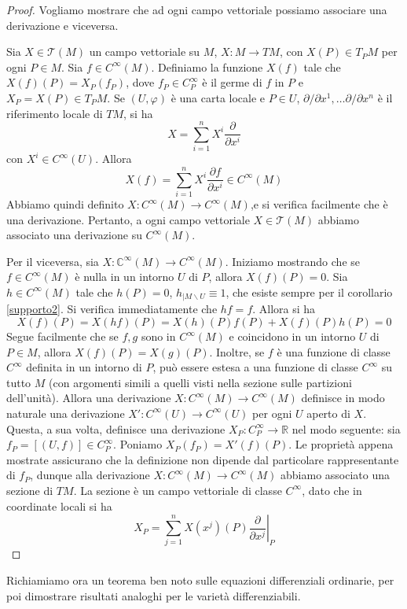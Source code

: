 \documentclass[a4paper,11pt]{article}
\theoremstyle{definition}
\theoremstyle{theorem}
\begin{document}
\begin{proof}
	Vogliamo mostrare che ad ogni campo vettoriale possiamo associare una derivazione e viceversa.
	
	Sia $X\in\mathcal{T}(M)$ un campo vettoriale su $M$, $X\colon M\to TM$, con $X(P)\in T_PM$ per ogni $P\in M$. Sia $f\in C^\infty(M)$. Definiamo la funzione $X(f)$ tale che $X(f)(P)=X_P(f_P)$, dove $f_P\in C^\infty_P$ è il germe di $f$ in $P$ e $X_P=X(P)\in T_PM$. Se $(U,\varphi)$ è una carta locale e $P\in U$, $\partial/\partial x^1,\dots\partial/\partial x^n$ è il riferimento locale di $TM$, si ha
	\[X=\sum_{i=1}^{n}X^i\frac{\partial}{\partial x^i}\]
	con $X^i\in C^\infty(U)$. Allora
	\[X(f)=\sum_{i=1}^{n}X^i\frac{\partial f}{\partial x^i}\in C^\infty(M)\]
	Abbiamo quindi definito $X\colon C^\infty(M)\to C^\infty(M)$,e si verifica facilmente che è una derivazione. Pertanto, a ogni campo vettoriale $X\in\mathcal{T}(M)$ abbiamo associato una derivazione su $C^\infty(M)$. 
	
	Per il viceversa, sia $X\colon\mathbb{C}^\infty(M)\to C^\infty(M)$. Iniziamo mostrando che se $f\in C^\infty(M)$ è nulla in un intorno $U$ di $P$, allora $X(f)(P)=0$. Sia $h\in C^\infty(M)$ tale che $h(P)=0$, $h_{|M\backslash U}\equiv 1$, che esiste sempre per il corollario \ref{supporto2}. Si verifica immediatamente che $hf=f$. Allora si ha
	\[X(f)(P)=X(hf)(P)=X(h)(P)f(P)+X(f)(P)h(P)=0\]
	Segue facilmente che se $f,g$ sono in $C^\infty(M)$ e coincidono in un intorno $U$ di $P\in M$, allora $X(f)(P)=X(g)(P)$.
	Inoltre, se $f$ è una funzione di classe $C^\infty$ definita in un intorno di $P$, può essere estesa a una funzione di classe $C^\infty$ su tutto $M$ (con argomenti simili a quelli visti nella sezione sulle partizioni dell'unità). Allora una derivazione $X\colon C^\infty(M)\to C^\infty(M)$ definisce in modo naturale una derivazione $X'\colon C^\infty(U)\to C^\infty(U)$ per ogni $U$ aperto di $X$. Questa, a sua volta, definisce una derivazione $X_P\colon C^\infty_P\to\mathbb{R}$ nel modo seguente: sia $f_P=[(U,f)]\in C^\infty_P$. Poniamo $X_P(f_P)=X'(f)(P)$. Le proprietà appena mostrate assicurano che la definizione non dipende dal particolare rappresentante di $f_P$, dunque alla derivazione $X\colon C^\infty(M)\to C^\infty(M)$ abbiamo associato una sezione di $TM$. La sezione è un campo vettoriale di classe $C^\infty$, dato che in coordinate locali si ha
	\[X_P=\sum_{j=1}^{n}X(x^j)(P)\left.\frac{\partial}{\partial x^j}\right|_{P}\]
\end{proof}
Richiamiamo ora un teorema ben noto sulle equazioni differenziali ordinarie, per poi dimostrare risultati analoghi per le varietà differenziabili.
\end{document}
